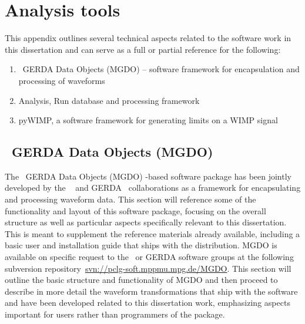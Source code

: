 

\chapter{Analysis tools}
\label{app:MGDO}

This appendix outlines several technical aspects related to the software work in this dissertation and can serve as a full or partial reference for the following:

	\begin{enumerate}
		\item \MJ~GERDA Data Objects (MGDO) -- software framework for encapsulation and processing of waveforms
		\item Analysis, Run database and processing framework
		\item pyWIMP, a software framework for generating limits on a WIMP signal
	\end{enumerate}

	\section{\MJ~GERDA Data Objects (MGDO)}
	\label{sec:WaveformProcMGDO}
	
	
	The \MJ~GERDA Data Objects (MGDO) \cpp-based software package has been
jointly developed by the \MJ~\cite{MJCollaboration} and
GERDA~\cite{GERDACollaboration} collaborations as a framework for
encapsulating and processing waveform data.  This section will reference some
of the functionality and layout of this software package, focusing on the
overall structure as well as particular aspects specifically relevant to this
dissertation.  This is meant to supplement the reference materials already
available, including a basic user and installation guide that ships with the
distribution.  MGDO is available on specific request to the \MJ~or GERDA
software groups at the following subversion
repository~\url{svn://pclg-soft.mppmu.mpg.de/MGDO}.  This section will outline
the basic structure and functionality of MGDO and then proceed to describe in
more detail the waveform transformations that ship with the software and have been developed
related to this dissertation work,
emphasizing aspects important for users rather than programmers of the package.  

